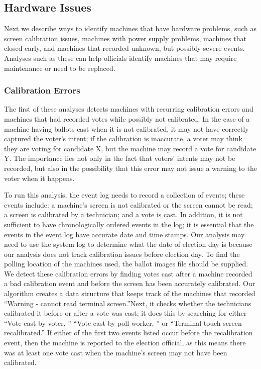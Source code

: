 \subsection{Hardware Issues}
Next we describe ways to identify machines that have hardware problems, such as screen calibration issues, machines with power supply problems, machines that closed early, and machines that recorded unknown, but possibly severe events.  Analyses such as these can help officials identify machines that may require maintenance or need to be replaced.  

\subsubsection{Calibration Errors}
The first of these analyses detects machines with recurring calibration errors and machines that had recorded votes while possibly not calibrated.  In the case of a machine having ballots cast when it is not calibrated, it may not have correctly captured the voter's intent; if the calibration is inaccurate, a voter may think they are voting for candidate X, but the machine may record a vote for candidate Y.  The importance lies not only in the fact that voters' intents may not be recorded, but also in the possibility that this error may not issue a warning to the voter when it happens.    

To run this analysis, the event log needs to record a collection of events; these events include: a machine's screen is not calibrated or the screen cannot be read; a screen is calibrated by a technician; and a vote is cast.  In addition, it is not sufficient to have chronologically ordered events in the log; it is essential that the events in the event log have accurate date and time stamps.  Our analysis may need to use the system log to determine what the date of election day is because our analysis does not track calibration issues before election day.  To find the polling location of the machines used, the ballot images file should be supplied.  We detect these calibration errors by finding votes cast after a machine recorded a bad calibration event and before the screen has been accurately calibrated.  Our algorithm creates a data structure that keeps track of the machines that recorded \textquotedblleft Warning - cannot read terminal screen.\textquotedblright \hspace{2 mm}Next, it checks whether the technicians calibrated it before or after a vote was cast; it does this by searching for either \textquotedblleft Vote cast by voter, \textquotedblright \hspace{1 mm} \textquotedblleft Vote cast by poll worker, \textquotedblright \hspace{1 mm} or \textquotedblleft Terminal touch-screen recalibrated.\textquotedblright \hspace{2 mm} If either of the first two events listed occur before the recalibration event, then the machine is reported to the election official, as this means there was at least one vote cast when the machine's screen may not have been calibrated.  

